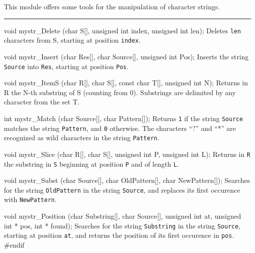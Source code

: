 
This module offers some tools for the manipulation of character strings. 

\bigskip\hrule
\code\iffalse
/* mystr.h for ANSI C */

#ifndef MYSTR_H
#define MYSTR_H
\fi

void mystr_Delete (char S[], unsigned int index, unsigned int len);
\endcode
 \tab  Deletes {\tt len} characters from S, starting at position
 {\tt index}.
 \endtab
\code


void mystr_Insert (char Res[], char Source[], unsigned int Pos);
\endcode
 \tab  Inserts the string {\tt Source} into {\tt Res}, 
  starting at position {\tt Pos}.
 \endtab
\code


void mystr_ItemS (char R[], char S[], const char T[], unsigned int N);
\endcode
 \tab  Returns in R the N-th substring of S (counting from 0).
  Substrings are delimited by any character from the set T.
 \endtab
\code


int mystr_Match (char Source[], char Pattern[]);
\endcode
 \tab  Returns {\tt 1} if the string {\tt Source} matches the 
  string {\tt Pattern}, and {\tt 0} otherwise.
  The characters ``?'' and ``*'' are recognized as wild characters in the
  string {\tt Pattern}.
 \endtab
\code


void mystr_Slice (char R[], char S[], unsigned int P, unsigned int L);
\endcode
 \tab  Returns in {\tt R} the substring in {\tt S} beginning at
  position {\tt P} and of length {\tt L}.
 \endtab
\code


void mystr_Subst (char Source[], char OldPattern[], char NewPattern[]);
\endcode
 \tab  Searches for the string {\tt OldPattern} in the string {\tt Source}, 
 and replaces its first occurence with {\tt NewPattern}.
 \endtab
\code


void mystr_Position (char Substring[], char Source[], unsigned int at,
                     unsigned int * pos, int * found);
\endcode
 \tab  Searches for the string {\tt Substring} in the string {\tt Source},
 starting at position {\tt at}, and returns the position of its first
 occurence in {\tt pos}.
 \endtab
\code\hide
#endif
\endhide\endcode

